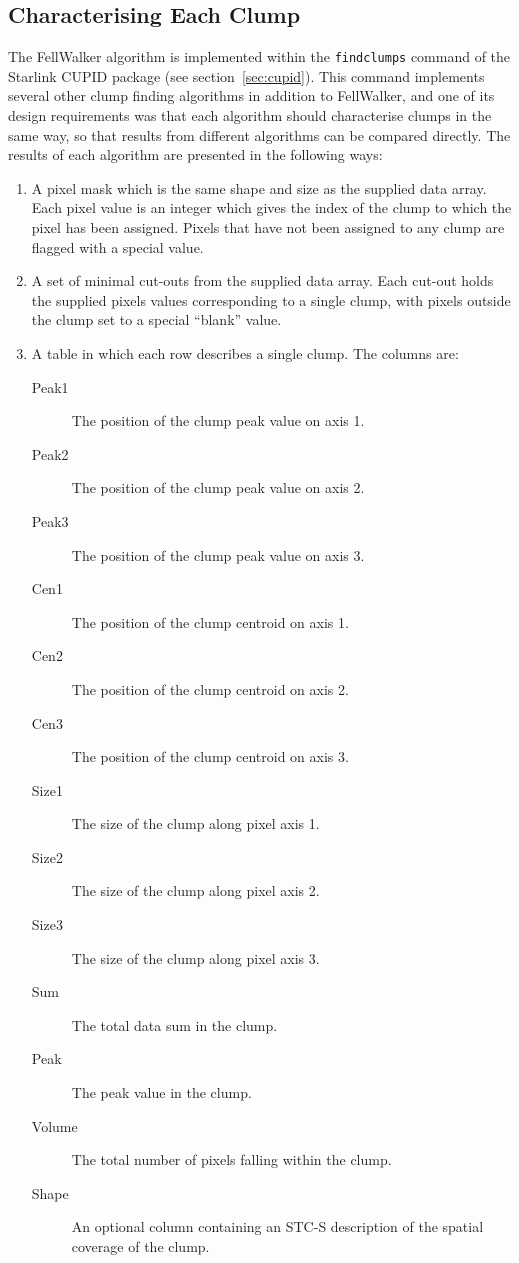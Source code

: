 \documentclass[final,authoryear,5p,times,twocolumn]{elsarticle}
\begin{document}
\subsection{Characterising Each Clump}
The FellWalker algorithm is implemented within the {\tt findclumps}
command of the Starlink CUPID package (see section~\ref{sec:cupid}). This
command implements several other clump finding algorithms in addition to
FellWalker, and one of its design requirements was that each algorithm should characterise clumps in
the same way, so that results from different algorithms can be compared
directly. The results of each algorithm are presented in the following ways:

\begin{enumerate}

\item A pixel mask which is the same shape and size as the supplied data
array. Each pixel value is an integer which gives the index of the clump
to which the pixel has been assigned. Pixels that have not been assigned
to any clump are flagged with a special value.

\item A set of minimal cut-outs from the supplied data array. Each cut-out
holds the supplied pixels values corresponding to a single clump, with pixels
outside the clump set to a special ``blank'' value.

\item A table in which each row describes a single clump. The columns are:

\begin{description}
\item[Peak1] The position of the clump peak value on axis 1.
\item[Peak2] The position of the clump peak value on axis 2.
\item[Peak3] The position of the clump peak value on axis 3.
\item[Cen1] The position of the clump centroid on axis 1.
\item[Cen2] The position of the clump centroid on axis 2.
\item[Cen3] The position of the clump centroid on axis 3.
\item[Size1] The size of the clump along pixel axis 1.
\item[Size2] The size of the clump along pixel axis 2.
\item[Size3] The size of the clump along pixel axis 3.
\item[Sum] The total data sum in the clump.
\item[Peak] The peak value in the clump.
\item[Volume] The total number of pixels falling within the clump.
\item[Shape] An optional column containing an STC-S description
\citep{2007STCS,2007STC,2010ASPC..434..213B} of the spatial coverage of the clump.
\end{description}

\end{enumerate}
\end{document}
